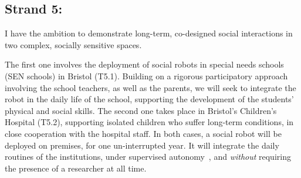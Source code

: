 % 
% 
% 
% 
% 
% 
% 
% 
% 



\subsection{Strand 5: \textbf{\wpFive}}

I have the ambition to demonstrate long-term, co-designed social
interactions in two complex, socially sensitive spaces.


The first one involves the deployment of social robots in special needs schools
(SEN schools) in Bristol (T5.1). Building on a rigorous participatory approach
involving the school teachers, as well as the parents, we will seek to integrate
the robot in the daily life of the school, supporting the development of the
students' physical and social skills. The second one takes place in Bristol's
Children's Hospital (T5.2), supporting isolated children who suffer long-term
conditions, in close cooperation with the hospital staff. In both cases, a
social robot will be deployed on premises, for one un-interrupted year. It will
integrate the daily routines of the institutions, under supervised
autonomy~\parencite{senft2017supervised}, and \emph{without} requiring the
presence of a researcher at all time.

